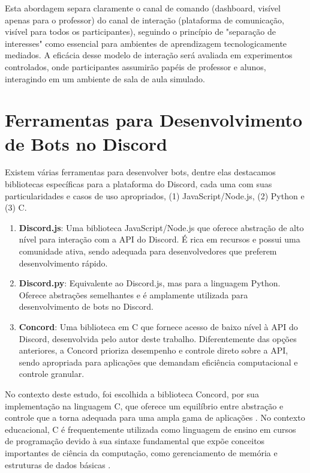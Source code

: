 Esta abordagem separa claramente o canal de comando (dashboard, visível apenas para o professor) do canal de interação (plataforma de comunicação, visível para todos os participantes), seguindo o princípio de "separação de interesses" como essencial para ambientes de aprendizagem tecnologicamente mediados. A eficácia desse modelo de interação será avaliada em experimentos controlados, onde participantes assumirão papéis de professor e alunos, interagindo em um ambiente de sala de aula simulado.


\section{Ferramentas para Desenvolvimento de Bots no Discord}
\label{sec:ferramentas}

Existem várias ferramentas para desenvolver bots, dentre elas destacamos bibliotecas específicas para a plataforma do Discord, cada uma com suas particularidades e casos de uso apropriados, (1) JavaScript/Node.js, (2) Python e (3) C. 

\begin{enumerate}
\item \textbf{Discord.js}\cite{discordjs}: Uma biblioteca JavaScript/Node.js que oferece abstração de alto nível para interação com a API do Discord. É rica em recursos e possui uma comunidade ativa, sendo adequada para desenvolvedores que preferem desenvolvimento rápido.
\item \textbf{Discord.py}\cite{discordpy}: Equivalente ao Discord.js, mas para a linguagem Python. Oferece abstrações semelhantes e é amplamente utilizada para desenvolvimento de bots no Discord.
\item \textbf{Concord}\cite{muller}: Uma biblioteca em C que fornece acesso de baixo nível à API do Discord, desenvolvida pelo autor deste trabalho. Diferentemente das opções anteriores, a Concord prioriza desempenho e controle direto sobre a API, sendo apropriada para aplicações que demandam eficiência computacional e controle granular.
\end{enumerate}

No contexto deste estudo, foi escolhida a biblioteca Concord, por sua implementação na linguagem C, que oferece um equilíbrio entre abstração e controle que a torna adequada para uma ampla gama de aplicações \cite{kernighan1988}. No contexto educacional, C é frequentemente utilizada como linguagem de ensino em cursos de programação devido à sua sintaxe fundamental que expõe conceitos importantes de ciência da computação, como gerenciamento de memória e estruturas de dados básicas \cite{kernighan1988}.

